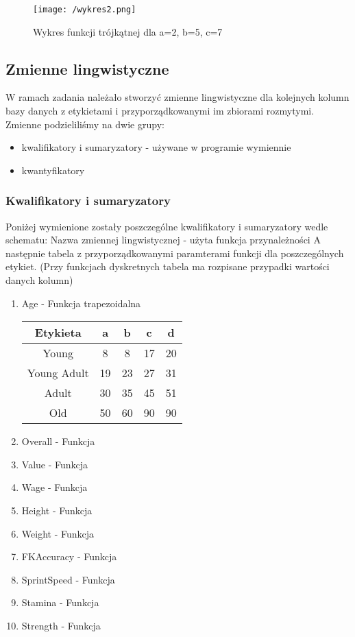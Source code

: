\documentclass{classrep}
\begin{document}
\begin{figure}[H]
    \centering
    \texttt{[image: /wykres2.png]}
    \caption{Wykres funkcji trójkątnej dla a=2, b=5, c=7}
\end{figure}

\subsection{Zmienne lingwistyczne}
W ramach zadania należało stworzyć zmienne lingwistyczne dla kolejnych kolumn bazy danych z etykietami i przyporządkowanymi im zbiorami rozmytymi. Zmienne podzieliliśmy na dwie grupy:
\begin{itemize}
    \item{kwalifikatory i sumaryzatory - używane w programie wymiennie}
    \item{kwantyfikatory}
\end{itemize}

\subsubsection{Kwalifikatory i sumaryzatory}
Poniżej wymienione zostały poszczególne kwalifikatory i sumaryzatory
wedle schematu:
Nazwa zmiennej lingwistycznej - użyta funkcja przynależności A następnie tabela z przyporządkowanymi paramterami funkcji dla poszczególnych etykiet. (Przy funkcjach dyskretnych tabela ma rozpisane przypadki
wartości danych kolumn)
\begin{enumerate}
    \item Age - Funkcja trapezoidalna
    \begin{center}
        \begin{tabular}{|c|c|c|c|c|}
            \hline
            Etykieta & a & b & c & d\\
            \hline
            Young & 8 & 8 & 17 & 20\\
            \hline
            Young Adult & 19 & 23 & 27 & 31\\
            \hline
            Adult & 30 & 35 & 45 & 51\\
            \hline
            Old & 50 & 60 & 90 & 90\\
            \hline
        \end{tabular}
    \end{center}
    \item Overall - Funkcja
    \item Value - Funkcja
    \item Wage - Funkcja
    \item Height - Funkcja
    \item Weight - Funkcja
    \item FKAccuracy - Funkcja
    \item SprintSpeed - Funkcja
    \item Stamina - Funkcja
    \item Strength - Funkcja
\end{enumerate}
\end{document}
